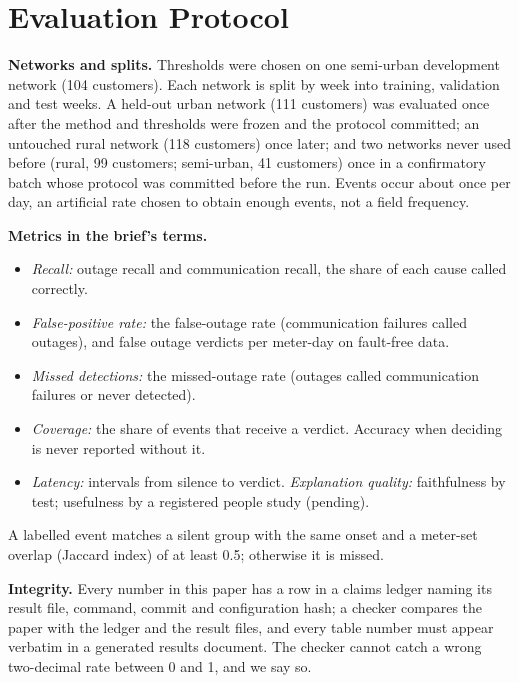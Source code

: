 \section{Evaluation Protocol}\label{sec:protocol}
\textbf{Networks and splits.} Thresholds were chosen on one semi-urban development network (104
customers). Each network is split by week into training, validation and test weeks. A held-out urban
network (111 customers) was evaluated once after the method and thresholds were frozen and the
protocol committed; an untouched rural network (118 customers) once later; and two networks never
used before (rural, 99 customers; semi-urban, 41 customers) once in a confirmatory batch
whose protocol was committed before the run. Events occur about once per day, an artificial rate
chosen to obtain enough events, not a field frequency.

\textbf{Metrics in the brief's terms.}
\begin{itemize}
\item \emph{Recall:} outage recall and communication recall, the share of each cause called correctly.
\item \emph{False-positive rate:} the false-outage rate (communication failures called outages), and
false outage verdicts per meter-day on fault-free data.
\item \emph{Missed detections:} the missed-outage rate (outages called communication failures or never
detected).
\item \emph{Coverage:} the share of events that receive a verdict. Accuracy when deciding is never
reported without it.
\item \emph{Latency:} intervals from silence to verdict. \emph{Explanation quality:} faithfulness by
test; usefulness by a registered people study (pending).
\end{itemize}
A labelled event matches a silent group with the same onset and a meter-set overlap (Jaccard index)
of at least 0.5; otherwise it is missed.

\textbf{Integrity.} Every number in this paper has a row in a claims ledger naming its result file,
command, commit and configuration hash; a checker compares the paper with the ledger and the result
files, and every table number must appear verbatim in a generated results document. The checker
cannot catch a wrong two-decimal rate between 0 and 1, and we say so.
